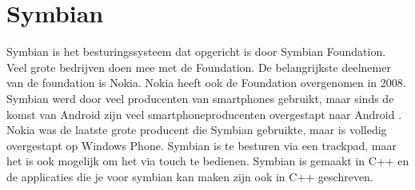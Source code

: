 \section{Symbian}

Symbian is het besturingssysteem dat opgericht is door Symbian Foundation.
Veel grote bedrijven doen mee met de Foundation.
De belangrijkste deelnemer van de foundation is Nokia.
Nokia heeft ook de Foundation overgenomen in 2008.
Symbian werd door veel producenten van smartphones gebruikt, maar sinds de komst van Android zijn veel smartphoneproducenten overgestapt naar Android \citep{nieuwemobiel}.
Nokia was de laatste grote producent die Symbian gebruikte, maar is volledig overgestapt op Windows Phone.
Symbian is te besturen via een trackpad, maar het is ook mogelijk om het via touch te bedienen.
Symbian is gemaakt in C++ en de applicaties die je voor symbian kan maken zijn ook in C++ geschreven.
